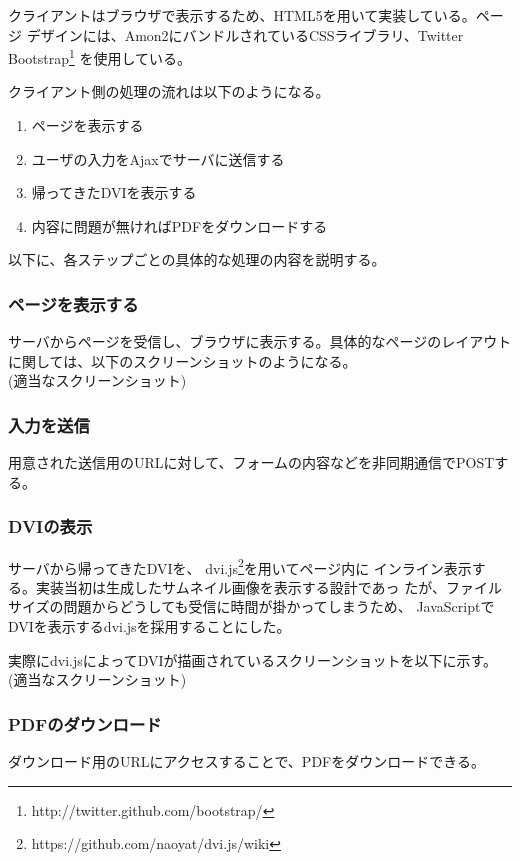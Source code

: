 \documentclass[a4j,9pt,titlepage]{jsarticle}
\begin{document}
クライアントはブラウザで表示するため、HTML5を用いて実装している。ページ
デザインには、Amon2にバンドルされているCSSライブラリ、Twitter
Bootstrap\footnote{http://twitter.github.com/bootstrap/}
を使用している。

クライアント側の処理の流れは以下のようになる。
\begin{enumerate}
 \item ページを表示する
 \item ユーザの入力をAjaxでサーバに送信する
 \item 帰ってきたDVIを表示する
 \item 内容に問題が無ければPDFをダウンロードする
\end{enumerate}

以下に、各ステップごとの具体的な処理の内容を説明する。

\subsubsection{ページを表示する}
サーバからページを受信し、ブラウザに表示する。具体的なページのレイアウト
に関しては、以下のスクリーンショットのようになる。\\

(適当なスクリーンショット)

\subsubsection{入力を送信}
用意された送信用のURLに対して、フォームの内容などを非同期通信でPOSTする。

\subsubsection{DVIの表示}
サーバから帰ってきたDVIを、
dvi.js\footnote{https://github.com/naoyat/dvi.js/wiki}を用いてページ内に
インライン表示する。実装当初は生成したサムネイル画像を表示する設計であっ
たが、ファイルサイズの問題からどうしても受信に時間が掛かってしまうため、
JavaScriptでDVIを表示するdvi.jsを採用することにした。

実際にdvi.jsによってDVIが描画されているスクリーンショットを以下に示す。
\\

(適当なスクリーンショット)

\subsubsection{PDFのダウンロード}
ダウンロード用のURLにアクセスすることで、PDFをダウンロードできる。
\end{document}
